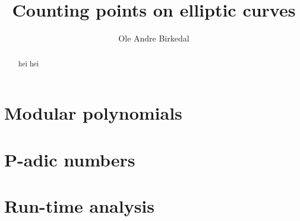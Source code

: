 \documentclass[a4paper,10pt]{amsart}
\title{Counting points on elliptic curves}
\author{Ole Andre Birkedal}
\begin{document}
\newtheorem{thm}{Theorem}
\newtheorem{mydef}{Definition}
\newtheorem{ex}{Example}
\newtheorem{prop}{Proposition}
\newtheorem{lemma}{Lemma}

\begin{abstract}
hei hei
\end{abstract}

\maketitle
\tableofcontents




\section{Modular polynomials}

\section{P-adic numbers}

\section{Run-time analysis}
\end{document}
